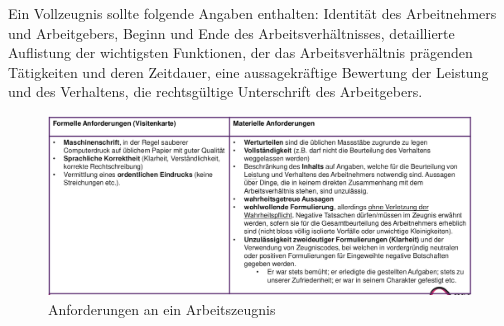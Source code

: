 Ein Vollzeugnis sollte folgende Angaben enthalten: Identität des Arbeitnehmers und Arbeitgebers, Beginn und Ende des Arbeitsverhältnisses, detaillierte Auflistung der wichtigsten Funktionen, der das Arbeitsverhältnis prägenden Tätigkeiten und deren Zeitdauer, eine aussagekräftige Bewertung der Leistung und des Verhaltens, die rechtsgültige Unterschrift des Arbeitgebers.

\begin{figure}[H]
  \centering
  \includegraphics*[width=\linewidth]{res/arbeitsrecht-arbeitszeugnis.png}
  \caption{Anforderungen an ein Arbeitszeugnis}
\end{figure}











